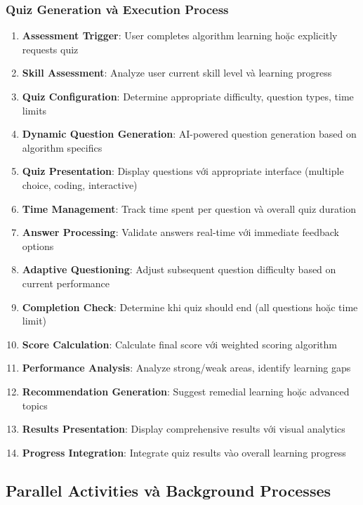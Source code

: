 \subsubsection{Quiz Generation và Execution Process}

\begin{enumerate}
    \item \textbf{Assessment Trigger}: User completes algorithm learning hoặc explicitly requests quiz
    \item \textbf{Skill Assessment}: Analyze user current skill level và learning progress
    \item \textbf{Quiz Configuration}: Determine appropriate difficulty, question types, time limits
    \item \textbf{Dynamic Question Generation}: AI-powered question generation based on algorithm specifics
    \item \textbf{Quiz Presentation}: Display questions với appropriate interface (multiple choice, coding, interactive)
    \item \textbf{Time Management}: Track time spent per question và overall quiz duration
    \item \textbf{Answer Processing}: Validate answers real-time với immediate feedback options
    \item \textbf{Adaptive Questioning}: Adjust subsequent question difficulty based on current performance
    \item \textbf{Completion Check}: Determine khi quiz should end (all questions hoặc time limit)
    \item \textbf{Score Calculation}: Calculate final score với weighted scoring algorithm
    \item \textbf{Performance Analysis}: Analyze strong/weak areas, identify learning gaps
    \item \textbf{Recommendation Generation}: Suggest remedial learning hoặc advanced topics
    \item \textbf{Results Presentation}: Display comprehensive results với visual analytics
    \item \textbf{Progress Integration}: Integrate quiz results vào overall learning progress
\end{enumerate}

\subsection{Parallel Activities và Background Processes}
\label{subsec:parallel-activities}

